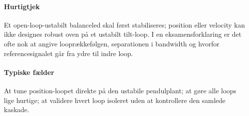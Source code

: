 \paragraph{Hurtigtjek}
Et open-loop-ustabilt balanceled skal først stabiliseres; position eller velocity kan
ikke designes robust oven på et ustabilt tilt-loop. I en eksamensforklaring er det ofte
nok at angive looprækkefølgen, separationen i bandwidth og hvorfor referencesignalet
går fra ydre til indre loop.

\paragraph{Typiske fælder}
At tune position-loopet direkte på den ustabile pendulplant; at gøre alle loops lige
hurtige; at validere hvert loop isoleret uden at kontrollere den samlede kaskade.
